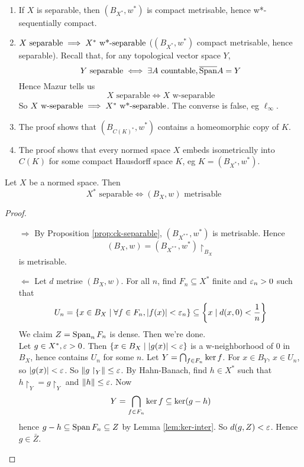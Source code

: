 \documentclass{article}
\begin{document}
\begin{rmks}~
  \begin{enumerate}
    \item If $X$ is separable, then $(B_{X^*}, w^*)$ is compact metrisable, hence w*-sequentially compact.
    \item $X \text{ separable} \implies X^* \text{ w*-separable}$ ($(B_{X^*}, w^*)$ compact metrisable, hence separable). Recall that, for any topological vector space $Y$,
    $$Y \text{ separable} \iff \exists A\text{ countable}, \overline{\operatorname{Span}} A = Y$$
    Hence Mazur tells us
    $$X \text{ separable} \iff X \text{ w-separable}$$
    So $X \text{ w-separable} \implies X^* \text{ w*-separable}$. The converse is false, eg $\ell_\infty$.
    \item The proof shows that $(B_{C(K)^*}, w^*)$ contains a homeomorphic copy of $K$.
    \item The proof shows that every normed space $X$ embeds isometrically into $C(K)$ for some compact Hausdorff space $K$, eg $K = (B_{X^*}, w^*)$.
  \end{enumerate}
\end{rmks}

\begin{prop}
  Let $X$ be a normed space. Then
  $$X^* \text{ separable} \iff (B_X, w) \text{ metrisable}$$
\end{prop}
\begin{proof}~
  \begin{itemize}
    \item[$\Rightarrow$] By Proposition \ref{prop:ck-separable}, $(B_{X^{**}}, w^*)$ is metrisable. Hence
    $$(B_X, w) = (B_{X^{**}}, w^*)\restriction_{B_X}$$
    is metrisable.
    \item[$\Leftarrow$] Let $d$ metrise $(B_X, w)$. For all $n$, find $F_n \subseteq X^*$ finite and $\varepsilon_n > 0$ such that
    $$U_n = \{x \in B_X \mid \forall f \in F_n, \left\lvert f(x)\right\rvert < \varepsilon_n\} \subseteq \left\{ x \mid d(x, 0) < \frac 1n\right\}$$
    We claim $Z = \operatorname{Span}_n F_n$ is dense. Then we're done. \\
    Let $g \in X^*, \varepsilon > 0$. Then $\{x \in B_X \mid \left\lvert g(x)\right\rvert < \varepsilon\}$ is a w-neighborhood of $0$ in $B_X$, hence contains $U_n$ for some $n$. Let $Y = \bigcap_{f \in F_n} \ker f$. For $x \in B_Y$, $x \in U_n$, so $\left\lvert g(x)\right\rvert < \varepsilon$. So $\left\lVert g\restriction_Y\right\rVert \le \varepsilon$. By Hahn-Banach, find $h \in X^*$ such that $h\restriction_Y = g\restriction_Y$ and $\left\lVert h\right\rVert \le \varepsilon$. Now
    $$Y = \bigcap_{f \in F_n} \ker f \subseteq \ker(g - h)$$
    hence $g - h \subseteq \operatorname{Span} F_n \subseteq Z$ by Lemma \ref{lem:ker-inter}. So $d(g, Z) < \varepsilon$. Hence $g \in \bar Z$.
  \end{itemize}
\end{proof}
\end{document}

